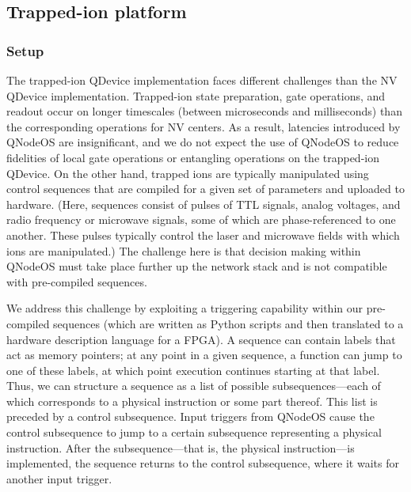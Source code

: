\subsection{Trapped-ion platform}
\label{qnodeos:sec:trapped-ion-platform}

\subsubsection{Setup}

The trapped-ion \ac{QDevice} implementation faces different challenges than the \ac{NV} \ac{QDevice} implementation. Trapped-ion state preparation, gate operations, and readout occur on longer timescales (between microseconds and milliseconds) than the corresponding operations for \ac{NV} centers. As a result, latencies introduced by \ac{QNodeOS} are insignificant, and we do not expect the use of \ac{QNodeOS} to reduce fidelities of local gate operations or entangling operations on the trapped-ion \ac{QDevice}. On the other hand, trapped ions are typically manipulated using control sequences that are compiled for a given set of parameters and uploaded to hardware. (Here, sequences consist of pulses of \ac{TTL} signals, analog voltages, and radio frequency or microwave signals, some of which are phase-referenced to one another. These pulses typically control the laser and microwave fields with which ions are manipulated.) The challenge here is that decision making within \ac{QNodeOS} must take place further up the network stack and is not compatible with pre-compiled sequences.

We address this challenge by exploiting a triggering capability within our pre-compiled sequences (which are written as Python scripts and then translated to a hardware description language for a \ac{FPGA}). A sequence can contain labels that act as memory pointers; at any point in a given sequence, a function can jump to one of these labels, at which point execution continues starting at that label. Thus, we can structure a sequence as a list of possible subsequences---each of which corresponds to a physical instruction or some part thereof. This list is preceded by a control subsequence. Input triggers from \ac{QNodeOS} cause the control subsequence to jump to a certain subsequence representing a physical instruction. After the subsequence---that is, the physical instruction---is implemented, the sequence returns to the control subsequence, where it waits for another input trigger.

